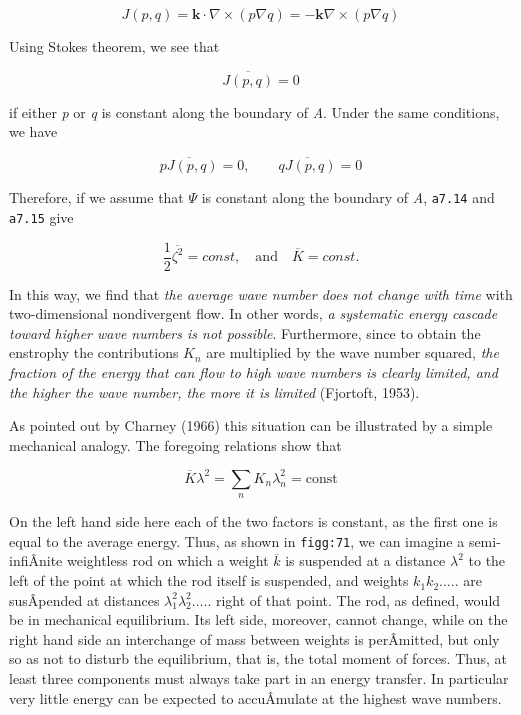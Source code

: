\[J(p,q) = \textbf{k}\cdot\nabla \times \left( p\nabla q \right) = - \textbf{k}\nabla \times \left( p\nabla q \right)\]

Using Stokes\textquotesingle{} theorem, we see that

{\[\overline{J\left( p,q \right)} = 0\]}

if either \emph{p} or \emph{q} is constant along the boundary of
\emph{A}. Under the same conditions, we have

{\[\overline{p J\left( p,q \right)} = 0, \qquad \overline{q J\left( p,q \right)} = 0\]}

Therefore, if we assume that \(\Psi\) is constant along the boundary of
\emph{A}, \texttt{a7.14} and \texttt{a7.15} give

{\[\frac{1}{2}\overline{\zeta^{2}} =  const, \quad \text{and} \quad \overline{K} = const.\]}

In this way, we find that \emph{the average wave number does not change
with time} with two-dimensional nondivergent flow. In other words,
\emph{a systematic energy cascade toward higher wave numbers is not
possible}. Furthermore, since to obtain the enstrophy the contributions
\(K_{n}\) are multiplied by the wave number squared, \emph{the fraction
of the energy that can flow to high wave numbers is clearly limited, and
the higher the wave number, the more it is limited} (Fjortoft, 1953).

As pointed out by Charney (1966) this situation can be illustrated by a
simple mechanical analogy. The foregoing relations show that

\[\overline{K}\lambda^{2} = \sum_{n}K_{n}\lambda_{n}^{2} = \text{const}\]

On the left hand side here each of the two factors is constant, as the
first one is equal to the average energy. Thus, as shown in
\texttt{figg:71}, we can imagine a semi-infiÂ­nite weightless rod on
which a weight \( \overline{k}\) is suspended at a distance
\(\lambda^{2}\) to the left of the point at which the rod itself is
suspended, and weights \(k_{1}k_{2}\ldots.. \) are susÂ­pended at
distances \(\lambda_{1}^{2}\lambda_{2}^{2}\ldots..\) right of that
point. The rod, as defined, would be in mechanical equilibrium. Its left
side, moreover, cannot change, while on the right hand side an
interchange of mass between weights is perÂ­mitted, but only so as not to
disturb the equilibrium, that is, the total moment of forces. Thus, at
least three components must always take part in an energy transfer. In
particular very little energy can be expected to accuÂ­mulate at the
highest wave numbers.

